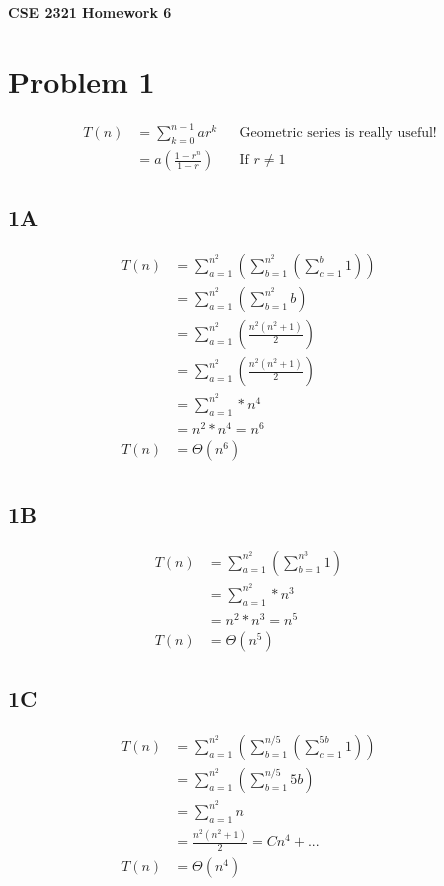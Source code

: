 \documentclass[14pt]{extarticle}
\begin{document}
\textbf{CSE 2321 Homework 6}

\section*{Problem 1}

\begin{align*}
T(n) &= \sum_{k=0}^{n-1} ar^k && \text{Geometric series is really useful!}  \\
&= a \left( \frac{1 - r^n}{1 - r} \right) && \text{If } r \neq 1
\end{align*}

\subsection*{1A}
\begin{align*}
T(n) &= \sum_{a=1}^{n^2}(\sum_{b=1}^{n^2}(\sum_{c=1}^{b}1)) && \text{}  \\
&= \sum_{a=1}^{n^2}(\sum_{b=1}^{n^2}b) && \text{} \\
&= \sum_{a=1}^{n^2}(\frac{n^2(n^2+1)}{2}) && \text{} \\
&= \sum_{a=1}^{n^2}(\frac{n^2(n^2+1)}{2}) && \text{} \\
&= \sum_{a=1}^{n^2}* n^4 && \text{} \\
&= n^2*n^4 = n^6 && \text{} \\
T(n) &= \Theta(n^6) \\
\end{align*}
\subsection*{1B}
\begin{align*}
T(n) &= \sum_{a=1}^{n^2}(\sum_{b=1}^{n^3}1) && \text{}  \\
&= \sum_{a=1}^{n^2}* n^3 && \text{} \\
&= n^2*n^3 = n^5 && \text{} \\
T(n) &= \Theta(n^5)
\end{align*}
\subsection*{1C}
\begin{align*}
T(n) &= \sum_{a=1}^{n^2}(\sum_{b=1}^{n/5}(\sum_{c=1}^{5b}1)) && \text{}  \\
&= \sum_{a=1}^{n^2}(\sum_{b=1}^{n/5}5b) \\
&= \sum_{a=1}^{n^2}n \\
&= \frac{n^2(n^2+1)}{2} = Cn^4 + ... \\
T(n) &= \Theta(n^4)
\end{align*}
\end{document}
